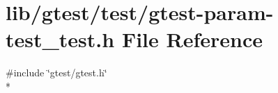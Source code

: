 \hypertarget{gtest-param-test__test_8h}{\section{lib/gtest/test/gtest-\/param-\/test\-\_\-test.h File Reference}
\label{gtest-param-test__test_8h}
}
{\ttfamily \#include \char`\"{}gtest/gtest.\-h\char`\"{}}\\*
